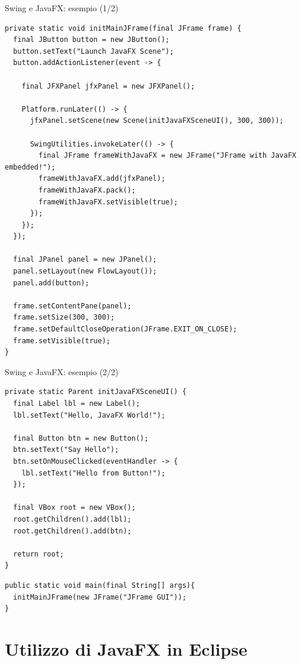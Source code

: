 \documentclass[presentation]{beamer}
\begin{document}
\begin{frame}[fragile]{Swing e JavaFX: esempio (1/2)}
\begin{lstlisting}[basicstyle=\tiny]
private static void initMainJFrame(final JFrame frame) {
  final JButton button = new JButton();
  button.setText("Launch JavaFX Scene");
  button.addActionListener(event -> {
            
    final JFXPanel jfxPanel = new JFXPanel();
            
    Platform.runLater(() -> {
      jfxPanel.setScene(new Scene(initJavaFXSceneUI(), 300, 300));
                    
      SwingUtilities.invokeLater(() -> {
        final JFrame frameWithJavaFX = new JFrame("JFrame with JavaFX embedded!");
        frameWithJavaFX.add(jfxPanel);
        frameWithJavaFX.pack();
        frameWithJavaFX.setVisible(true);
      });
    });
  });
        
  final JPanel panel = new JPanel();
  panel.setLayout(new FlowLayout());
  panel.add(button);

  frame.setContentPane(panel);
  frame.setSize(300, 300);
  frame.setDefaultCloseOperation(JFrame.EXIT_ON_CLOSE);
  frame.setVisible(true);
}
\end{lstlisting}
\end{frame}

\begin{frame}[fragile]{Swing e JavaFX: esempio (2/2)}
\begin{lstlisting}[basicstyle=\tiny]  
private static Parent initJavaFXSceneUI() {
  final Label lbl = new Label();
  lbl.setText("Hello, JavaFX World!");

  final Button btn = new Button();
  btn.setText("Say Hello");
  btn.setOnMouseClicked(eventHandler -> {
    lbl.setText("Hello from Button!");
  });

  final VBox root = new VBox();
  root.getChildren().add(lbl);
  root.getChildren().add(btn);

  return root;
}
\end{lstlisting}

\begin{lstlisting}[basicstyle=\tiny]
public static void main(final String[] args){
  initMainJFrame(new JFrame("JFrame GUI"));
}
\end{lstlisting}
\end{frame}

\section{Utilizzo di JavaFX in Eclipse}
\end{document}
